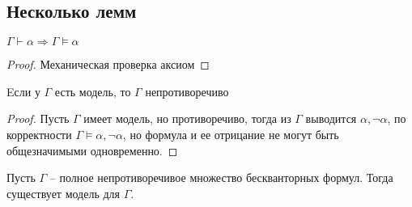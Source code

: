 \subsection{Несколько лемм}
\label{sec-8-4}
\begin{lemma}
$\Gamma \vdash \alpha \Rightarrow \Gamma \vDash \alpha$
\end{lemma}
\begin{proof}
Механическая проверка аксиом
\end{proof}
\begin{lemma}
Eсли у $\Gamma$ есть модель, то $\Gamma$ непротиворечиво
\end{lemma}
\begin{proof}
Пусть $\Gamma$ имеет модель, но противоречиво, тогда из $\Gamma$ выводится $\alpha, \neg \alpha$, по корректности $\Gamma \vDash \alpha, \neg \alpha$, но формула и ее отрицание не могут быть общезначимыми одновременно.
\end{proof}
\begin{lemma}
Пусть $\Gamma$ -- полное непротиворечивое множество бескванторных формул. Тогда существует модель для $\Gamma$.
\end{lemma}
